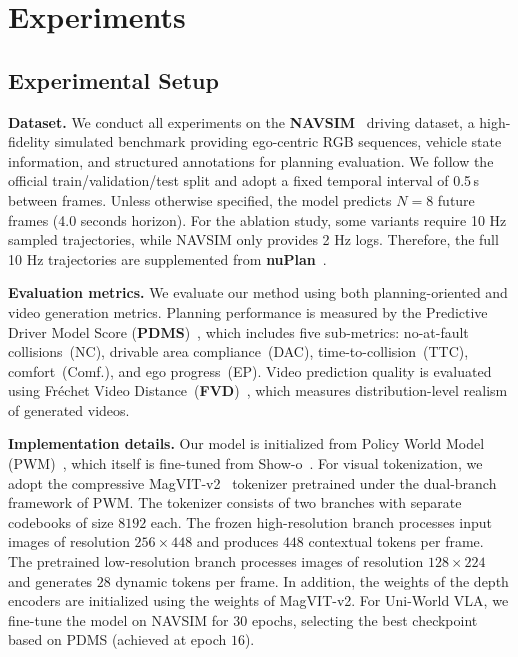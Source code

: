 \documentclass[runningheads]{llncs}
\begin{document}
\section{Experiments}
\label{sec:experiments}

\subsection{Experimental Setup}

\noindent\textbf{Dataset.} 
We conduct all experiments on the \textbf{NAVSIM}~\cite{daniel2024navsim, cao2025pseudosimulation} driving dataset, a high-fidelity simulated benchmark providing ego-centric RGB sequences, vehicle state information, and structured annotations for planning evaluation. We follow the official train/validation/test split and adopt a fixed temporal interval of 0.5\,s between frames. Unless otherwise specified, the model predicts \(N=8\) future frames (4.0 seconds horizon).
For the ablation study, some variants require 10 Hz sampled trajectories, while NAVSIM only provides 2 Hz logs. Therefore, the full 10 Hz trajectories are supplemented from \textbf{nuPlan}~\cite{caesar2021nuplan}.

\noindent\textbf{Evaluation metrics.} 
\label{sec:metrics}
We evaluate our method using both planning-oriented and video generation metrics. Planning performance is measured by the Predictive Driver Model Score (\textbf{PDMS})~\cite{daniel2024navsim}, which includes five sub-metrics: no-at-fault collisions~(NC), drivable area compliance~(DAC), time-to-collision~(TTC), comfort~(Comf.), and ego progress~(EP). Video prediction quality is evaluated using Fréchet Video Distance~(\textbf{FVD})~\cite{unterthiner2018fvd}, which measures distribution-level realism of generated videos.

\noindent\textbf{Implementation details.}
Our model is initialized from Policy World Model (PWM)~\cite{zhao2025pwm}, 
which itself is fine-tuned from Show-o~\cite{xie2024showo}. 
For visual tokenization, we adopt the compressive MagVIT-v2~\cite{yu2024magvitv2} tokenizer 
pretrained under the dual-branch framework of PWM. 
The tokenizer consists of two branches with separate codebooks of size $8192$ each. 
The frozen high-resolution branch processes input images of resolution 
$256 \times 448$ and produces $448$ contextual tokens per frame. 
The pretrained low-resolution branch processes images of resolution 
$128 \times 224$ and generates $28$ dynamic tokens per frame. In addition, the weights of the depth encoders are initialized using the weights of MagVIT-v2.
For Uni-World VLA, we fine-tune the model on NAVSIM for $30$ epochs, 
selecting the best checkpoint based on PDMS (achieved at epoch $16$).
\end{document}
